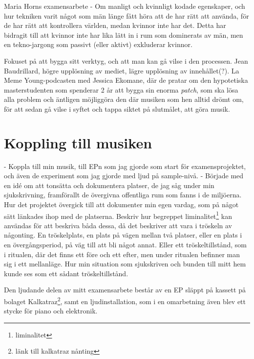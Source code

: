 \documentclass{article}
\begin{document}
  Maria Horns examensarbete - Om manligt och kvinnligt kodade egenskaper, och hur tekniken varit något som män
  länge fått höra att de har rätt att använda, för de har rätt att kontrollera världen, medan kvinnor inte har
  det. Detta har bidragit till att kvinnor inte har lika lätt in i rum som dominerats av män, men en
  tekno-jargong som passivt (eller aktivt) exkluderar kvinnor. 

  Fokuset på att bygga sitt verktyg, och att man kan gå vilse i den processen. Jean Baudrillard, högre
  upplösning av mediet, lägre upplösning av innehållet(?). 
  La Meme Young-podcasten med Jessica Ekomane, där de pratar om den hypotetiska masterstudenten som spenderar
  2 år att bygga sin enorma \emph{patch}, som ska lösa alla problem och äntligen möjliggöra den där musiken
  som hen alltid drömt om, för att sedan gå vilse i syftet och tappa siktet på slutmålet, att göra musik. 




\section{Koppling till musiken}
- Koppla till min musik, till EPn som jag gjorde som start för examensprojektet, och även de experiment som
  jag gjorde med ljud på sample-nivå. 
- Började med en idé om att tonsätta och dokumentera platser, de jag såg under min sjukskrivning, framförallt
  de övergivna offentliga rum som fanns i de miljöerna. Hur det projektet övergick till att dokumenter min
  egen vardag, som på något sätt länkades ihop med de platserna. Beskriv hur begreppet
  liminalitet\footnote{liminalitet} kan användas för att beskriva båda dessa, då det beskriver att vara i
  tröskeln av någonting. En tröskelplats, en plats på vägen mellan två platser, eller en plats i en
  övergångsperiod, på väg till att bli något annat. Eller ett tröskeltillstånd, som i ritualen, där det finns
  ett före och ett efter, men under ritualen befinner man sig i ett mellanläge. Hur min situation som
  sjukskriven och bunden till mitt hem kunde ses som ett sådant tröskeltillstånd.

  Den ljudande delen av mitt examensarbete består av en EP släppt på kassett på bolaget
  Kalkatraz\footnote{länk till kalkatraz nånting}, samt en ljudinstallation, som i en omarbetning även blev
  ett stycke för piano och elektronik.
\end{document}
